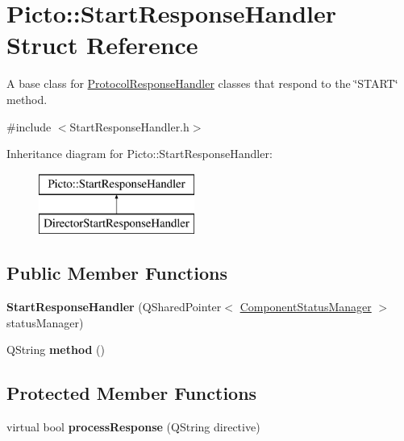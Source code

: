 \hypertarget{struct_picto_1_1_start_response_handler}{\section{Picto\-:\-:Start\-Response\-Handler Struct Reference}
\label{struct_picto_1_1_start_response_handler}
}


A base class for \hyperlink{struct_picto_1_1_protocol_response_handler}{Protocol\-Response\-Handler} classes that respond to the \char`\"{}\-S\-T\-A\-R\-T\char`\"{} method.  




{\ttfamily \#include $<$Start\-Response\-Handler.\-h$>$}

Inheritance diagram for Picto\-:\-:Start\-Response\-Handler\-:\begin{figure}[H]
\begin{center}
\leavevmode
\includegraphics[height=2.000000cm]{struct_picto_1_1_start_response_handler}
\end{center}
\end{figure}
\subsection*{Public Member Functions}
\begin{DoxyCompactItemize}
\item 
\hypertarget{struct_picto_1_1_start_response_handler_a9e5acf71fa38511b2981a6c0033a72c0}{{\bfseries Start\-Response\-Handler} (Q\-Shared\-Pointer$<$ \hyperlink{class_component_status_manager}{Component\-Status\-Manager} $>$ status\-Manager)}\label{struct_picto_1_1_start_response_handler_a9e5acf71fa38511b2981a6c0033a72c0}

\item 
\hypertarget{struct_picto_1_1_start_response_handler_a4fda7f0e797793303c9a75e0fa0b4fcc}{Q\-String {\bfseries method} ()}\label{struct_picto_1_1_start_response_handler_a4fda7f0e797793303c9a75e0fa0b4fcc}

\end{DoxyCompactItemize}
\subsection*{Protected Member Functions}
\begin{DoxyCompactItemize}
\item 
\hypertarget{struct_picto_1_1_start_response_handler_a8a8040e290bbb11a352f4bea3cf791a0}{virtual bool {\bfseries process\-Response} (Q\-String directive)}\label{struct_picto_1_1_start_response_handler_a8a8040e290bbb11a352f4bea3cf791a0}

\end{DoxyCompactItemize}


